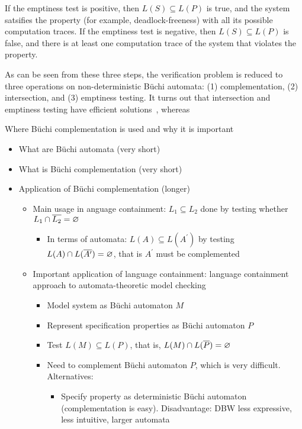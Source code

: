 If the emptiness test is positive, then $L(S) \subseteq L(P)$ is true, and the system satsifies the property (for example, deadlock-freeness) with all its possible computation traces. If the emptiness test is negative, then $L(S) \subseteq L(P)$ is false, and there is at least one computation trace of the system that violates the property.

As can be seen from these three steps, the verification problem is reduced to three operations on non-deterministic Büchi automata: (1) complementation, (2) intersection, and (3) emptiness testing. It turns out that intersection and emptiness testing have efficient solutions~\cite{1996_vardi}, whereas 


Where Büchi complementation is used and why it is important

\begin{itemize}
\item What are Büchi automata (very short)
\item What is Büchi complementation (very short)
\item Application of Büchi complementation (longer)
  \begin{itemize}
  \item Main usage in anguage containment: $L_1 \subseteq L_2$ done by testing whether $L_1 \cap \cl1{L_2} = \varnothing$
    \begin{itemize}
    \item In terms of automata: $L(A) \subseteq L(A^\prime)$ by testing $L(A) \cap L(\cl1{A^\prime}) = \varnothing$, that is $A^\prime$ must be complemented
    \end{itemize}
  \item Important application of language containment: language containment approach to automata-theoretic model checking
    \begin{itemize}
    \item Model system as Büchi automaton $M$
    \item Represent specification properties as Büchi automaton $P$
    \item Test $L(M) \subseteq L(P)$, that is, $L(M) \cap L(\cl1{P}) = \varnothing$
    \item Need to complement Büchi automaton $P$, which is very difficult. Alternatives:
      \begin{itemize}
      \item Specify property as deterministic Büchi automaton (complementation is easy). Disadvantage: DBW less expressive, less intuitive, larger automata

\end{itemize}
\end{itemize}
\end{itemize}
\end{itemize}
